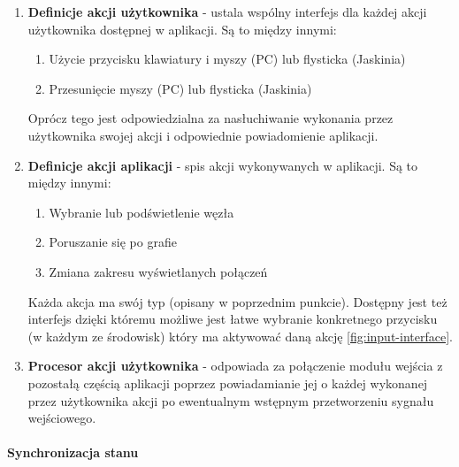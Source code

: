 \begin{enumerate}[label=\textbullet]
	\item \textbf{Definicje akcji użytkownika} - ustala wspólny interfejs dla każdej akcji użytkownika dostępnej w aplikacji. Są to między innymi: 
	\begin{enumerate}[label=\textbullet]
		\item Użycie przycisku klawiatury i myszy (PC) lub flysticka (Jaskinia)
		\item Przesunięcie myszy (PC) lub flysticka (Jaskinia)
	\end{enumerate}
	Oprócz tego jest odpowiedzialna za nasłuchiwanie wykonania przez użytkownika swojej akcji i odpowiednie powiadomienie aplikacji.
	
	\item \textbf{Definicje akcji aplikacji} - spis akcji wykonywanych w aplikacji. Są to między innymi: 
	\begin{enumerate}[label=\textbullet]
		\item Wybranie lub podświetlenie węzła
		\item Poruszanie się po grafie
		\item Zmiana zakresu wyświetlanych połączeń
	\end{enumerate}
	Każda akcja ma swój typ (opisany w poprzednim punkcie). Dostępny jest też interfejs dzięki któremu możliwe jest łatwe wybranie konkretnego przycisku (w każdym ze środowisk) który ma aktywować daną akcję \ref{fig:input-interface}.
	
	\item \textbf{Procesor akcji użytkownika} - odpowiada za połączenie modułu wejścia z pozostałą częścią aplikacji poprzez powiadamianie jej o każdej wykonanej przez użytkownika akcji po ewentualnym wstępnym przetworzeniu sygnału wejściowego.
\end{enumerate}


\paragraph{Synchronizacja stanu}

